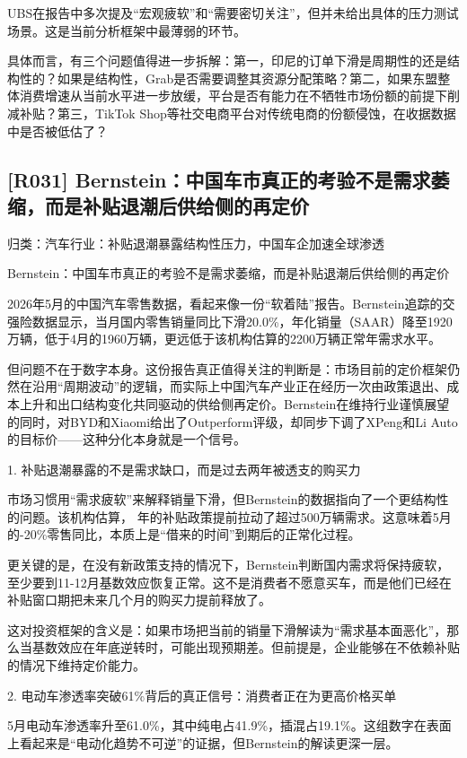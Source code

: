 \documentclass[11pt]{ctexart}
\begin{document}
UBS在报告中多次提及“宏观疲软”和“需要密切关注”，但并未给出具体的压力测试场景。这是当前分析框架中最薄弱的环节。

具体而言，有三个问题值得进一步拆解：第一，印尼的订单下滑是周期性的还是结构性的？如果是结构性，Grab是否需要调整其资源分配策略？第二，如果东盟整体消费增速从当前水平进一步放缓，平台是否有能力在不牺牲市场份额的前提下削减补贴？第三，TikTok Shop等社交电商平台对传统电商的份额侵蚀，在收据数据中是否被低估了？

\subsection{[R031] Bernstein：中国车市真正的考验不是需求萎缩，而是补贴退潮后供给侧的再定价}
{\small\color{refgray}归类：汽车行业：补贴退潮暴露结构性压力，中国车企加速全球渗透}

Bernstein：中国车市真正的考验不是需求萎缩，而是补贴退潮后供给侧的再定价

2026年5月的中国汽车零售数据，看起来像一份“软着陆”报告。Bernstein追踪的交强险数据显示，当月国内零售销量同比下滑20.0\%，年化销量（SAAR）降至1920万辆，低于4月的1960万辆，更远低于该机构估算的2200万辆正常年需求水平。

但问题不在于数字本身。这份报告真正值得关注的判断是：市场目前的定价框架仍然在沿用“周期波动”的逻辑，而实际上中国汽车产业正在经历一次由政策退出、成本上升和出口结构变化共同驱动的供给侧再定价。Bernstein在维持行业谨慎展望的同时，对BYD和Xiaomi给出了Outperform评级，却同步下调了XPeng和Li Auto的目标价——这种分化本身就是一个信号。

1. 补贴退潮暴露的不是需求缺口，而是过去两年被透支的购买力

市场习惯用“需求疲软”来解释销量下滑，但Bernstein的数据指向了一个更结构性的问题。该机构估算， 年的补贴政策提前拉动了超过500万辆需求。这意味着5月的-20\%零售同比，本质上是“借来的时间”到期后的正常化过程。

更关键的是，在没有新政策支持的情况下，Bernstein判断国内需求将保持疲软，至少要到11-12月基数效应恢复正常。这不是消费者不愿意买车，而是他们已经在补贴窗口期把未来几个月的购买力提前释放了。

这对投资框架的含义是：如果市场把当前的销量下滑解读为“需求基本面恶化”，那么当基数效应在年底逆转时，可能出现预期差。但前提是，企业能够在不依赖补贴的情况下维持定价能力。

2. 电动车渗透率突破61\%背后的真正信号：消费者正在为更高价格买单

5月电动车渗透率升至61.0\%，其中纯电占41.9\%，插混占19.1\%。这组数字在表面上看起来是“电动化趋势不可逆”的证据，但Bernstein的解读更深一层。
\end{document}
